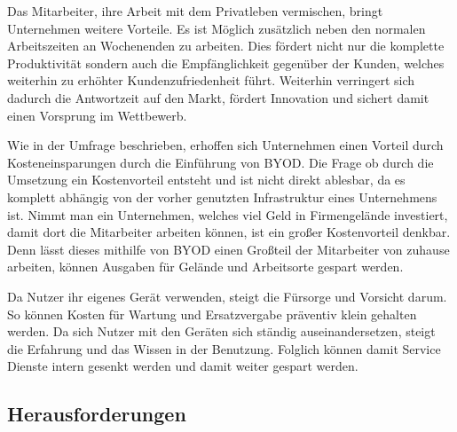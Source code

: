 Das Mitarbeiter, ihre Arbeit mit dem Privatleben vermischen, bringt Unternehmen weitere Vorteile. Es ist Möglich zusätzlich neben den normalen Arbeitszeiten an Wochenenden zu arbeiten. Dies fördert nicht nur die komplette Produktivität sondern auch die Empfänglichkeit gegenüber der Kunden, welches weiterhin zu erhöhter Kundenzufriedenheit führt. Weiterhin verringert sich dadurch die Antwortzeit auf den Markt, fördert Innovation und sichert damit einen Vorsprung im Wettbewerb.

Wie in der Umfrage beschrieben, erhoffen sich Unternehmen einen Vorteil durch Kosteneinsparungen durch die Einführung von BYOD. Die Frage ob durch die Umsetzung ein Kostenvorteil entsteht und ist nicht direkt ablesbar, da es komplett abhängig von der vorher genutzten Infrastruktur eines Unternehmens ist. Nimmt man ein Unternehmen, welches viel Geld in Firmengelände investiert, damit dort die Mitarbeiter arbeiten können, ist ein großer Kostenvorteil denkbar. Denn lässt dieses mithilfe von BYOD einen Großteil der Mitarbeiter von zuhause arbeiten, können Ausgaben für Gelände und Arbeitsorte gespart werden. 

Da Nutzer ihr eigenes Gerät verwenden, steigt die Fürsorge und Vorsicht darum. So können Kosten für Wartung und Ersatzvergabe präventiv klein gehalten werden. Da sich Nutzer mit den Geräten sich ständig auseinandersetzen, steigt die Erfahrung und das Wissen in der Benutzung. Folglich können damit Service Dienste intern gesenkt werden und damit weiter gespart werden.

\subsection{Herausforderungen}
